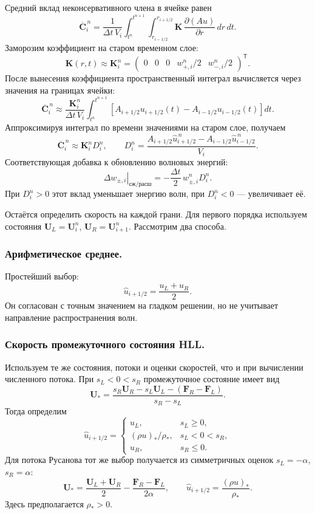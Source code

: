 \documentclass[11pt,a4paper]{article}
\providecommand{\U}{}
\renewcommand{\U}{\bm U}
\newcommand{\F}{\bm F}
\begin{document}
Средний вклад неконсервативного члена в ячейке равен
\[
\overline{\bm C}_i^{\,n}
=
\frac{1}{\Delta t\,V_i}
\int_{t^n}^{t^{n+1}}
\int_{r_{i-1/2}}^{r_{i+1/2}}
\bm K\,\frac{\partial(Au)}{\partial r}\,dr\,dt.
\]
Заморозим коэффициент на старом временном слое:
\[
\bm K(r,t)\approx\bm K_i^n
=
\begin{pmatrix}
0&0&0&w_{+,i}^n/2&w_{-,i}^n/2
\end{pmatrix}^{\mathsf T}.
\]
После вынесения коэффициента пространственный интеграл
вычисляется через значения на границах ячейки:
\[
\overline{\bm C}_i^{\,n}
\approx
\frac{\bm K_i^n}{\Delta t\,V_i}
\int_{t^n}^{t^{n+1}}
\left[
A_{i+1/2}u_{i+1/2}(t)
-A_{i-1/2}u_{i-1/2}(t)
\right]dt.
\]
Аппроксимируя интеграл по времени значениями
на старом слое, получаем
\begin{equation}
\overline{\bm C}_i^{\,n}
\approx \bm K_i^n D_i^n,
\qquad
D_i^n=
\frac{
A_{i+1/2}\widehat u_{i+1/2}^{\,n}
-A_{i-1/2}\widehat u_{i-1/2}^{\,n}
}{V_i}.
\label{eq:compression_first_order}
\end{equation}
Соответствующая добавка к обновлению волновых энергий:
\[
\left.\Delta w_{\pm,i}\right|_{\text{сж/расш}}
=-\frac{\Delta t}{2}\,w_{\pm,i}^nD_i^n.
\]
При $D_i^n>0$ этот вклад уменьшает энергию волн,
при $D_i^n<0$ --- увеличивает её.

Остаётся определить скорость на каждой грани.
Для первого порядка используем состояния
$\U_L=\U_i^n$, $\U_R=\U_{i+1}^n$.
Рассмотрим два способа.

\subsubsection{Арифметическое среднее.}
Простейший выбор:
\[
\widehat u_{i+1/2}=\frac{u_L+u_R}{2}.
\]
Он согласован с точным значением на гладком решении,
но не учитывает направление распространения волн.

\subsubsection{Скорость промежуточного состояния HLL.}
Используем те же состояния, потоки и оценки скоростей,
что и при вычислении численного потока.
При $s_L<0<s_R$ промежуточное состояние имеет вид
\[
\U_*=
\frac{
s_R\U_R-s_L\U_L-(\F_R-\F_L)
}{s_R-s_L}.
\]
Тогда определим
\[
\widehat u_{i+1/2}=
\begin{cases}
u_L, & s_L\geq0,\\[2pt]
(\rho u)_*/\rho_*, & s_L<0<s_R,\\[2pt]
u_R, & s_R\leq0.
\end{cases}
\]
Для потока Русанова тот же выбор получается
из симметричных оценок $s_L=-\alpha$, $s_R=\alpha$:
\[
\U_*=
\frac{\U_L+\U_R}{2}
-\frac{\F_R-\F_L}{2\alpha},
\qquad
\widehat u_{i+1/2}=\frac{(\rho u)_*}{\rho_*}.
\]
Здесь предполагается $\rho_*>0$.
\end{document}
